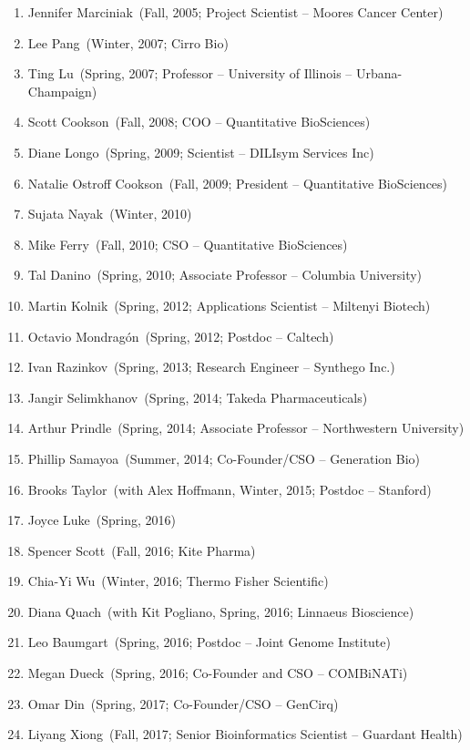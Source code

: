 \begin{enumerate}\setlength{\itemsep}{1pt}\setlength{\parskip}{0pt}

\item Jennifer Marciniak~(Fall, 2005; Project Scientist -- Moores Cancer Center)
\item Lee Pang~(Winter, 2007; Cirro Bio)
\item Ting Lu~(Spring, 2007; Professor -- University of Illinois -- Urbana-Champaign)
\item Scott Cookson~(Fall, 2008; COO -- Quantitative BioSciences)
\item Diane Longo~(Spring, 2009; Scientist -- DILIsym Services Inc)
\item Natalie Ostroff Cookson~(Fall, 2009; President -- Quantitative BioSciences)
\item Sujata Nayak~(Winter, 2010)
\item Mike Ferry~(Fall, 2010; CSO -- Quantitative BioSciences)
\item Tal Danino~(Spring, 2010; Associate Professor -- Columbia University)
\item Martin Kolnik~(Spring, 2012; Applications Scientist -- Miltenyi Biotech)
\item Octavio Mondrag\'{o}n~(Spring, 2012; Postdoc -- Caltech)
\item Ivan Razinkov~(Spring, 2013; Research Engineer -- Synthego Inc.)
\item Jangir Selimkhanov~(Spring, 2014; Takeda Pharmaceuticals)
\item Arthur Prindle~(Spring, 2014; Associate Professor -- Northwestern University)
\item Phillip Samayoa~(Summer, 2014; Co-Founder/CSO -- Generation Bio)
\item Brooks Taylor~(with Alex Hoffmann, Winter, 2015; Postdoc -- Stanford)
\item Joyce Luke~(Spring, 2016)
\item Spencer Scott~(Fall, 2016; Kite Pharma)
\item Chia-Yi Wu~(Winter, 2016; Thermo Fisher Scientific)
\item Diana Quach~(with Kit Pogliano, Spring, 2016; Linnaeus Bioscience)
\item Leo Baumgart~(Spring, 2016; Postdoc -- Joint Genome Institute)
\item Megan Dueck~(Spring, 2016; Co-Founder and CSO -- COMBiNATi)
\item Omar Din~(Spring, 2017; Co-Founder/CSO -- GenCirq)
\item Liyang Xiong~(Fall, 2017; Senior Bioinformatics Scientist -- Guardant Health)

\end{enumerate}
